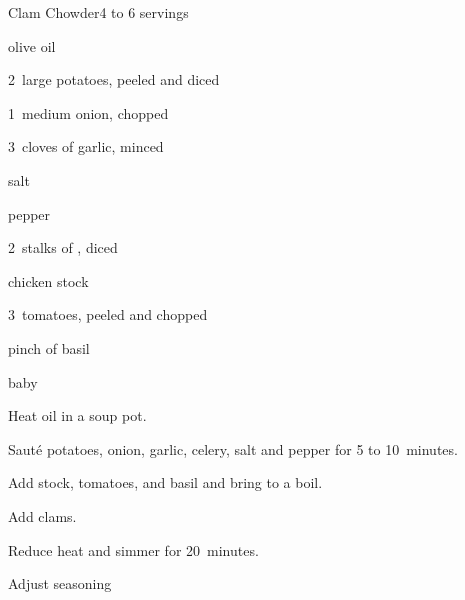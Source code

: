 \begin{recipe}{Clam Chowder}{}{4 to 6 servings}

\begin{ingredients}
\item {} olive oil
\item 2~large potatoes, peeled and diced
\item 1~medium onion, chopped
\item 3~cloves of garlic, minced
\item salt
\item pepper
\item 2~stalks of , diced
\item {} chicken stock
\item 3~tomatoes, peeled and chopped
\item pinch of basil
\item {} baby 
\end{ingredients}

\begin{directions}
\item Heat oil in a soup pot.
\item Saut\'e potatoes, onion, garlic, celery, salt and pepper for 5 to 10~minutes.
\item Add stock, tomatoes, and basil and bring to a boil.
\item Add clams.
\item Reduce heat and simmer for 20~minutes.
\item Adjust seasoning
\end{directions}

\end{recipe}
